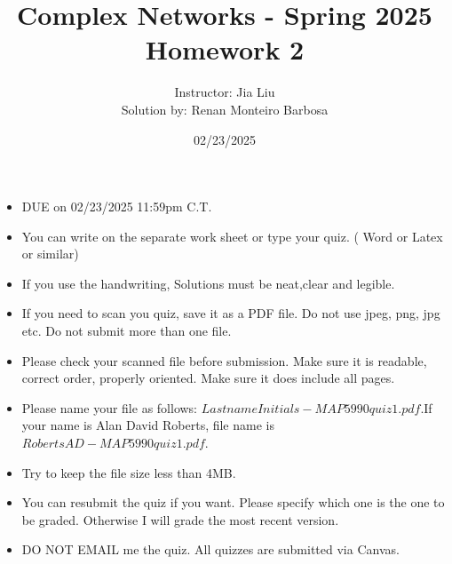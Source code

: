 \documentclass{amsart}
\theoremstyle{definition}
\theoremstyle{remark}
\numberwithin{equation}{section}
\begin{document}
\title{Complex Networks  - Spring 2025\\{\bf Homework 2}}%
\author{Instructor: Jia Liu \\ Solution by: Renan Monteiro Barbosa}%
\date{02/23/2025}


\maketitle
\begin{itemize}
\item DUE on 02/23/2025 11:59pm C.T.
\item You can write on the separate work sheet or type your quiz. ( Word or Latex or similar)
\item If you use the handwriting, Solutions must be neat,clear and legible.
\item If you need to scan you quiz, save it as a PDF file. Do not use jpeg, png, jpg etc. Do not submit more than one file.
\item Please check your scanned file before submission. Make sure it is readable, correct order, properly oriented. Make sure it does include all pages.
\item Please name your file as follows: $LastnameInitials-MAP5990quiz1.pdf$.If your name is Alan David Roberts, file name is $RobertsAD-MAP5990quiz1.pdf$.
\item Try to keep the file size less than 4MB.
\item You can resubmit the quiz if you want. Please specify which one is the one to be graded. Otherwise I will grade the most recent version.
\item DO NOT EMAIL me the quiz. All quizzes are submitted via Canvas.
\end{itemize}
\end{document}

